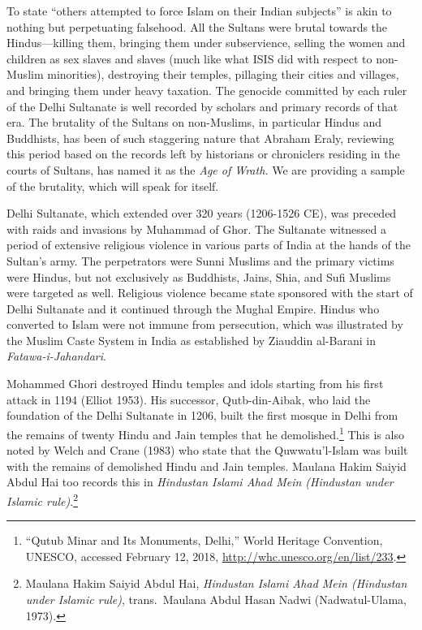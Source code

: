 To state “others attempted to force Islam on their Indian subjects” is akin to nothing but perpetuating falsehood. All the Sultans were brutal towards the Hindus—killing them, bringing them under subservience, selling the women and children as sex slaves and slaves (much like what ISIS did with respect to non-Muslim minorities), destroying their temples, pillaging their cities and villages, and bringing them under heavy taxation. The genocide committed by each ruler of the Delhi Sultanate is well recorded by scholars and primary records of that era. The brutality of the Sultans on non-Muslims, in particular Hindus and Buddhists, has been of such staggering nature that Abraham Eraly, reviewing this period based on the records left by historians or chroniclers residing in the courts of Sultans, has named it as the \textit{Age of Wrath.} We are providing a sample of the brutality, which will speak for itself. 

Delhi Sultanate, which extended over 320 years (1206-1526 CE), was preceded with raids and invasions by Muhammad of Ghor. The Sultanate witnessed a period of extensive religious violence in various parts of India at the hands of the Sultan’s army. The perpetrators were Sunni Muslims and the primary victims were Hindus, but not exclusively as Buddhists, Jains, Shia, and Sufi Muslims were targeted as well. Religious violence became state sponsored with the start of Delhi Sultanate and it continued through the Mughal Empire. Hindus who converted to Islam were not immune from persecution, which was illustrated by the Muslim Caste System in India as established by Ziauddin al-Barani in\textit{ Fatawa-i-Jahandari}.

Mohammed Ghori destroyed Hindu temples and idols starting from his first attack in 1194 (Elliot 1953). His successor, Qutb-din-Aibak, who laid the foundation of the Delhi Sultanate in 1206, built the first mosque in Delhi from the remains of twenty Hindu and Jain temples that he demolished.\footnote{“Qutub Minar and Its Monuments, Delhi,” World Heritage 	Convention, UNESCO, accessed February 12, 2018, \url{http://whc.unesco.org/en/list/233}.} This is also noted by Welch and Crane (1983) who state that the Quwwatu'l-Islam was built with the remains of demolished Hindu and Jain temples. Maulana Hakim Saiyid Abdul Hai too records this in \textit{Hindustan Islami Ahad Mein (Hindustan under Islamic rule)}.\footnote{Maulana 	Hakim Saiyid Abdul Hai, \textit{Hindustan Islami Ahad Mein (Hindustan under Islamic rule)}, trans.\ Maulana Abdul Hasan Nadwi (Nadwatul-Ulama, 1973).} 

